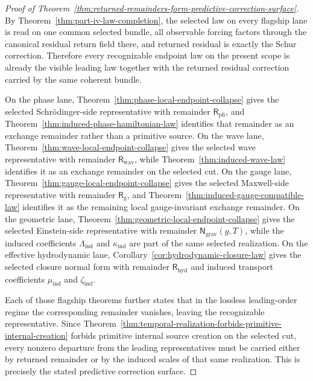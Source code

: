 \begin{proof}[Proof of Theorem~\ref{thm:returned-remainders-form-predictive-correction-surface}]
\label{proof:thm:returned-remainders-form-predictive-correction-surface}
By Theorem~\ref{thm:part-iv-law-completion}, the selected law on every flagship
lane is read on one common selected bundle, all observable forcing factors
through the canonical residual return field there, and returned residual is
exactly the Schur correction. Therefore every recognizable endpoint law on the
present scope is already the visible leading law together with the returned
residual correction carried by the same coherent bundle.

On the phase lane, Theorem~\ref{thm:phase-local-endpoint-collapse} gives the
selected Schr\"odinger-side representative with remainder
\(\mathsf R_{\mathrm{ph}}\), and
Theorem~\ref{thm:induced-phase-hamiltonian-law} identifies that remainder as an
exchange remainder rather than a primitive source. On the wave lane,
Theorem~\ref{thm:wave-local-endpoint-collapse} gives the selected wave
representative with remainder \(\mathsf R_{\mathrm{wav}}\), while
Theorem~\ref{thm:induced-wave-law} identifies it as an exchange remainder on
the selected cut. On the gauge lane,
Theorem~\ref{thm:gauge-local-endpoint-collapse} gives the selected Maxwell-side
representative with remainder \(\mathsf R_{\mathrm g}\), and
Theorem~\ref{thm:induced-gauge-compatible-law} identifies it as the remaining
local gauge-invariant exchange remainder. On the geometric lane,
Theorem~\ref{thm:geometric-local-endpoint-collapse} gives the selected
Einstein-side representative with remainder
\(\mathsf N_{\mathrm{grav}}(g,T)\), while the induced coefficients
\(\Lambda_{\mathrm{ind}}\) and \(\kappa_{\mathrm{ind}}\) are part of the same
selected realization. On the effective hydrodynamic lane,
Corollary~\ref{cor:hydrodynamic-closure-law} gives the selected closure normal
form with remainder \(\mathsf R_{\mathrm{hyd}}\) and induced transport
coefficients \(\mu_{\mathrm{ind}}\) and \(\zeta_{\mathrm{ind}}\).

Each of those flagship theorems further states that in the lossless
leading-order regime the corresponding remainder vanishes, leaving the
recognizable representative. Since
Theorem~\ref{thm:temporal-realization-forbids-primitive-internal-creation}
forbids primitive internal source creation on the selected cut, every nonzero
departure from the leading representatives must be carried either by returned
remainder or by the induced scales of that same realization. This is precisely
the stated predictive correction surface.
\end{proof}

